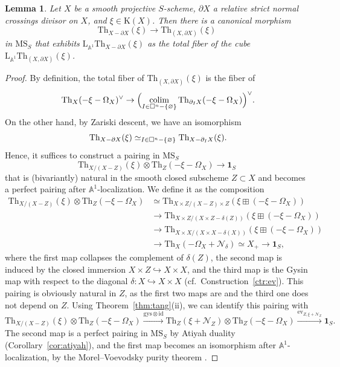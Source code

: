 \documentclass{amsart}
\numberwithin{equation}{section}
\theoremstyle{plain}
\newtheorem{lemma}[equation]{Lemma}
\theoremstyle{definition}
\let\scr=\mathcal
\let\bb=\mathbb
\def\A{\bb A}
\def\1{\mathbf 1}
\def\L{\mathrm{L}{}}
\let\into=\hookrightarrow
\def\id{\mathrm{id}}
\def\Th{\mathrm{Th}}
\def\K{\mathrm{K}{}}
\def\MS{\mathrm{MS}}
\def\ev{\mathrm{ev}}
\def\setminus{-}
\def\gys{\mathrm{gys}{}}
\let\lim=\relax
\DeclareMathOperator*{\lim}{lim}
\DeclareMathOperator*{\colim}{colim}
\begin{document}
\begin{lemma}\label{lem:purity}
Let $X$ be a smooth projective $S$-scheme, $\partial X$ a relative strict normal crossings divisor on $X$, and $\xi\in\K(X)$.
Then there is a canonical morphism 
\[
	\Th_{X\setminus\partial X}(\xi) \to \Th_{(X,\partial X)}(\xi)
\]
in $\MS_S$ that exhibits $\L_{\A^1}\Th_{X\setminus\partial X}(\xi)$ as the total fiber of the cube $\L_{\A^1}\Th_{(X,\partial X)}(\xi)$.
\end{lemma}

\begin{proof}
By definition, the total fiber of $\Th_{(X,\partial X)}(\xi)$ is the fiber of
\[
	\Th_X(-\xi-\Omega_X)^\vee \to \Bigl( \colim_{I\in\Box^n\setminus\{\varnothing\}}\Th_{\partial_IX}(-\xi-\Omega_X) \Bigr)^\vee \rlap.
\]
On the other hand, by Zariski descent, we have an isomorphism
\[
	\Th_{X\setminus\partial X}(\xi) \simeq \lim_{I\in\Box^n\setminus\{\varnothing\}}\Th_{X\setminus\partial_IX}(\xi) \rlap.
\]
Hence, it suffices to construct a pairing in $\MS_S$ 
\[
	\Th_{X/(X\setminus Z)}(\xi)\otimes \Th_Z(-\xi-\Omega_X) \to \1_S
\]
that is (bivariantly) natural in the smooth closed subscheme $Z\subset X$ and becomes a perfect pairing after $\A^1$-localization.
We define it as the composition
\begin{align*}
	\Th_{X/(X\setminus Z)}(\xi)\otimes \Th_Z(-\xi-\Omega_X)
	& \simeq \Th_{X\times Z/(X\setminus Z)\times Z}(\xi\boxplus(-\xi-\Omega_X)) \\
	&\to \Th_{X\times Z/(X\times Z\setminus\delta(Z))}(\xi\boxplus(-\xi-\Omega_X)) \\
	&\to \Th_{X\times X/(X\times X\setminus\delta(X))}(\xi\boxplus(-\xi-\Omega_X)) \\
	&\to \Th_{X}(-\Omega_X+\scr N_\delta)\simeq X_+ \to \1_S,
\end{align*}
where the first map collapses the complement of $\delta(Z)$, the second map is induced by the closed immersion $X\times Z\into X\times X$, and the third map is the Gysin map with respect to the diagonal $\delta\colon X\into X\times X$ (cf.\ Construction~\ref{ctr:ev}).
This pairing is obviously natural in $Z$, as the first two maps are and the third one does not depend on $Z$.
Using Theorem~\ref{thm:tang}(ii), we can identify this pairing with
\[
\Th_{X/(X\setminus Z)}(\xi)\otimes \Th_Z(-\xi-\Omega_X) \xrightarrow{\gys\otimes\id}
\Th_{Z}(\xi+\scr N_Z)\otimes \Th_Z(-\xi-\Omega_X) \xrightarrow{\ev_{Z,\xi+\scr N_Z}} \1_S.
\]
The second map is a perfect pairing in $\MS_S$ by Atiyah duality (Corollary~\ref{cor:atiyah}), and the first map becomes an isomorphism after $\A^1$-localization, by the Morel--Voevodsky purity theorem \cite[Section~3, Theorem~2.23]{MV}.
\end{proof}
\end{document}
